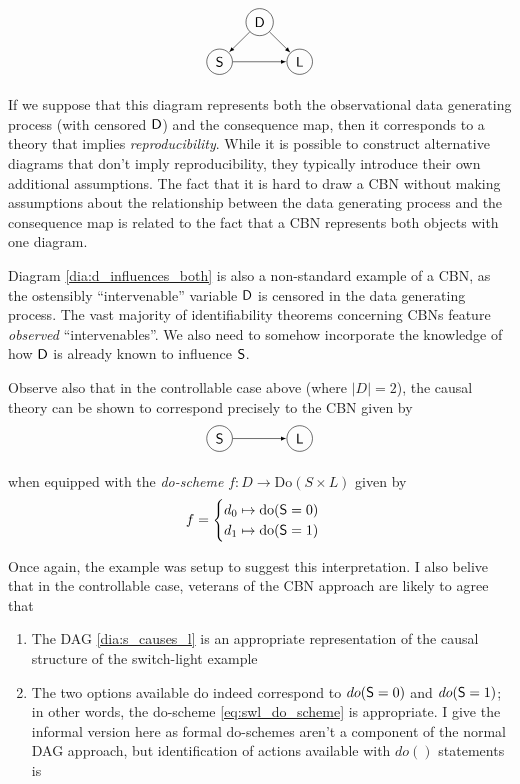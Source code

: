 \begin{align}
\begin{tikzpicture}[-latex]
\path (0,0) node[draw,circle] (D) {$\RV{D}$}
++(-1,-1) node[draw,circle] (S) {$\RV{S}$}
++(2,0) node[draw,circle] (L) {$\RV{L}$};
\draw (D) -- (S);
\draw (S) -- (L);
\draw (D) -- (L);
\end{tikzpicture}\label{dia:d_influences_both}
\end{align}

If we suppose that this diagram represents both the observational data generating process (with censored $\mathsf{D}$) and the consequence map, then it corresponds to a theory that implies \emph{reproducibility}. While it is possible to construct alternative diagrams that don't imply reproducibility, they typically introduce their own additional assumptions. The fact that it is hard to draw a CBN without making assumptions about the relationship between the data generating process and the consequence map is related to the fact that a CBN represents both objects with one diagram.

Diagram \ref{dia:d_influences_both} is also a non-standard example of a CBN, as the ostensibly ``intervenable'' variable $\mathsf{D}$ is censored in the data generating process. The vast majority of identifiability theorems concerning CBNs feature \emph{observed} ``intervenables''. We also need to somehow incorporate the knowledge of how $\mathsf{D}$ is already known to influence $\mathsf{S}$.

Observe also that in the controllable case above (where $|D|=2$), the causal theory can be shown to correspond precisely to the CBN given by
\begin{align}
\begin{tikzpicture}[-latex]
\path (0,0) node[draw,circle] (S) {$\RV{S}$}
++(2,0) node[draw,circle] (L) {$\RV{L}$};
\draw (S) -- (L);
\end{tikzpicture}\label{dia:s_causes_l}
\end{align}

when equipped with the \emph{do-scheme} $f:D\to \mathrm{Do}(S\times L)$ given by
\begin{align}
f = \begin{cases}
	d_0 \mapsto \mathrm{do}(\mathsf{S}=0)\\
	d_1\mapsto \mathrm{do}(\mathsf{S}=1)
\end{cases}\label{eq:swl_do_scheme}
\end{align}

Once again, the example was setup to suggest this interpretation. I also belive that in the controllable case, veterans of the CBN approach are likely to agree that
\begin{enumerate}
 \item The DAG \ref{dia:s_causes_l} is an appropriate representation of the causal structure of the switch-light example
 \item The two options available do indeed correspond to $do(\mathsf{S}=0)$ and $do(\mathsf{S}=1)$; in other words, the do-scheme \ref{eq:swl_do_scheme} is appropriate. I give the informal version here as formal do-schemes aren't a component of the normal DAG approach, but identification of actions available with $do()$ statements is
 \end{enumerate}


